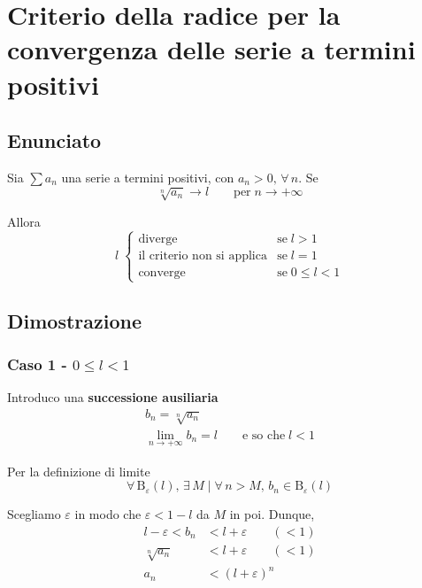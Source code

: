\documentclass[../../analisi1]{subfiles}
\begin{document}
    \chapter{Criterio della radice per la convergenza delle serie a termini positivi}
    \label{criterioRadiceSerie}

        \section*{Enunciato}

            Sia \(\sum a_n\) una serie a termini positivi, con \(a_n > 0, \, \forall \, n\). Se
             \[\sqrt[n]{a_n} \rightarrow l \qquad \text{per} \; n  \rightarrow +\infty \]
            
            Allora
            \[
                l \;
                \begin{cases}
                    \text{diverge} & \text{se} \; l > 1\\
                    \text{il criterio non si applica} & \text{se} \; l = 1\\
                    \text{converge} & \text{se} \; 0 \leqslant l < 1
                \end{cases}
            \]
            
        \section*{Dimostrazione}
            
            \subsection*{Caso 1 - \(0 \leqslant l < 1\)} 
                    
                Introduco una \textbf{successione ausiliaria}
                \begin{gather*}
                    b_n = \sqrt[n]{a_n}\\
                    \lim_{n \to +\infty} b_n = l \qquad \text{e so che} \; l < 1
                \end{gather*}

                Per la definizione di limite
                \[\forall \, \mathrm{B}_\varepsilon (l), \, \exists \, M \mid \forall \, n > M, \, b_n \in \mathrm{B}_\varepsilon (l) \]

                Scegliamo \(\varepsilon\) in modo che \(\varepsilon < 1 - l\) da \(M\) in poi. Dunque,
                \begin{align*}
                    l - \varepsilon < b_n &< l + \varepsilon \qquad (<1) \\
                    \sqrt[n]{a_n} &< l + \varepsilon \qquad (<1) \\
                    a_n &< (l+\varepsilon)^{n}  
                \end{align*}
                                     
\end{document}
